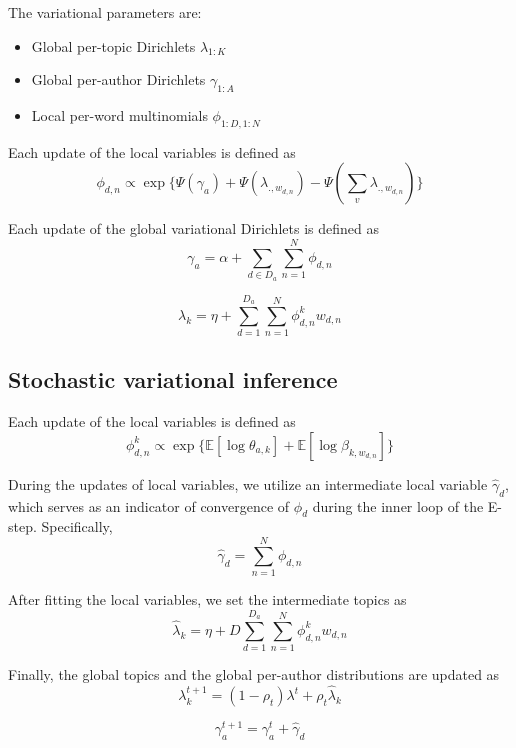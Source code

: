 \documentclass[12pt,abstracton,a4paper]{scrartcl}
\begin{document}
The variational parameters are:
\begin{itemize}
	\item Global per-topic Dirichlets $\lambda_{1:K}$
	\item Global per-author Dirichlets $\gamma_{1:A}$
	\item Local per-word multinomials $\phi_{1:D,1:N}$
\end{itemize}

Each update of the local variables is defined as
\begin{equation}
\phi_{d,n} \propto \exp \{ \Psi(\gamma_a) + \Psi(\lambda_{.,w_{d,n}}) - \Psi(\sum_{v}{\lambda_{.,w_{d,n}}}) \}
\end{equation}

Each update of the global variational Dirichlets is defined as
\begin{equation}
\gamma_a = \alpha + \sum_{d \in D_a}{\sum_{n=1}^{N}{\phi_{d,n}}}
\end{equation}

\begin{equation}
\lambda_k = \eta + \sum_{d=1}^{D_a}{\sum_{n=1}^{N}{\phi^k_{d,n}w_{d,n}}}
\end{equation}



\subsection{Stochastic variational inference}

Each update of the local variables is defined as
\begin{equation}
\phi^k_{d,n} \propto \exp \{ \mathbb{E}[\log \theta_{a,k}] + \mathbb{E}[\log \beta_{k,w_{d,n}}] \}
\end{equation}

During the updates of local variables, we utilize an intermediate local variable $\hat{\gamma}_d$, which serves as an indicator of convergence of $\phi_{d}$ during the inner loop of the E-step. Specifically,
\begin{equation}
\hat{\gamma}_d = \sum_{n=1}^{N}{\phi_{d,n}}
\end{equation}


After fitting the local variables, we set the intermediate topics as
\begin{equation}
\hat{\lambda}_k = \eta + D \sum_{d=1}^{D_a}{\sum_{n=1}^{N}{\phi^k_{d,n}w_{d,n}}}
\end{equation}

Finally, the global topics and the global per-author distributions are updated as
\begin{equation}
\lambda^{t+1}_k = (1 - \rho_t) \lambda^{t} + \rho_t \hat{\lambda}_k
\end{equation}

\begin{equation}
\gamma^{t+1}_a = \gamma^{t}_a + \hat{\gamma}_d
\end{equation}
\end{document}
